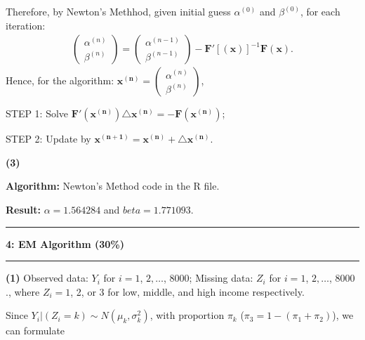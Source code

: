 \documentclass[11pt]{article}
\newcommand\question[2]{\vspace{.25in}\hrule\textbf{#1: #2}\vspace{.5em}\hrule\vspace{.10in}}
\renewcommand\part[1]{\vspace{.10in}\textbf{(#1)}}
\newcommand\algorithm{\vspace{.10in}\textbf{Algorithm: }}
\newcommand\result{\vspace{.10in}\textbf{Result: }}
\begin{document}
Therefore, by Newton's Methhod, given initial guess $\alpha^{(0)}$ and $\beta^{(0)}$, for each iteration: 
\begin{align*}
    \begin{pmatrix} \alpha^{(n)} \\ \beta^{(n)} \end{pmatrix} = \begin{pmatrix} \alpha^{(n-1)} \\ \beta^{(n-1)} \end{pmatrix} - \mathbf{F'}[(\mathbf{x})]^{-1}\mathbf{F}(\mathbf{x}).
\end{align*}
Hence, for the algorithm: $\mathbf{x^{(n)}} = \begin{pmatrix} \alpha^{(n)} \\ \beta^{(n)} \end{pmatrix}$,

STEP 1: Solve $\mathbf{F'}(\mathbf{x^{(n)}}) \mathbf{\triangle x^{(n)}} = - \mathbf{F}(\mathbf{x^{(n)}})$;

STEP 2: Update by $\mathbf{x^{(n+1)}} = \mathbf{x^{(n)}} + \mathbf{\triangle x^{(n)}}$.

\part{3}

\algorithm{Newton's Method code in the R file.}

\result{$\alpha = 1.564284$ and $beta = 1.771093$.}

\question{4}{EM Algorithm (30\%)}

\part{1} Observed data: $Y_i$ for $i = 1$, $2, \dots$, $8000$; Missing data: $Z_i$ for $i = 1$, $2, \dots$, $8000$., where $Z_i = 1$, 2, or 3 for low, middle, and high income respectively.

Since $Y_i \big\rvert (Z_i=k) \sim N(\mu_k, \sigma_k^2)$, with proportion $\pi_k$ ($\pi_3 = 1 - (\pi_1 + \pi_2)$), we can formulate 
\end{document}

